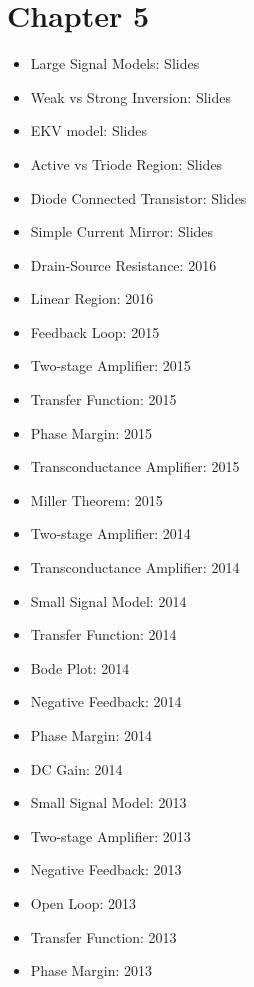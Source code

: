 \documentclass[twocolumn]{article}
\begin{document}
  \section*{Chapter 5}
    \begin{itemize}
      \item Large Signal Models: Slides
      \item Weak vs Strong Inversion: Slides
      \item EKV model: Slides
      \item Active vs Triode Region: Slides
      \item Diode Connected Transistor: Slides
      \item Simple Current Mirror: Slides

      \item Drain-Source Resistance: 2016
      \item Linear Region: 2016

      \item Feedback Loop: 2015
      \item Two-stage Amplifier: 2015
      \item Transfer Function: 2015
      \item Phase Margin: 2015
      \item Transconductance Amplifier: 2015
      \item Miller Theorem: 2015

      \item Two-stage Amplifier: 2014
      \item Transconductance Amplifier: 2014
      \item Small Signal Model: 2014
      \item Transfer Function: 2014
      \item Bode Plot: 2014
      \item Negative Feedback: 2014
      \item Phase Margin: 2014
      \item DC Gain: 2014

      \item Small Signal Model: 2013
      \item Two-stage Amplifier: 2013
      \item Negative Feedback: 2013
      \item Open Loop: 2013
      \item Transfer Function: 2013
      \item Phase Margin: 2013
    \end{itemize}
\end{document}
